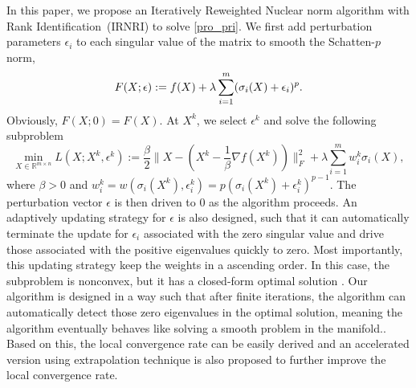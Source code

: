 \documentclass[twoside,11pt]{article}
\numberwithin{equation}{section}
\begin{document}
In this paper, we propose an Iteratively Reweighted  Nuclear norm algorithm with Rank Identification~(IRNRI) to solve \eqref{pro_pri}.
We first add perturbation  parameters $\epsilon_i$ to each singular value of the matrix to smooth the Schatten-$p$ norm, 
\begin{equation}\label{pro_reg_eps}
  F(X;\epsilon) := f(X) + \lambda \sum_{i=1}^{m} (\sigma_{i} (X) + \epsilon_i)^{p}. \\
\end{equation} 
Obviously, $F(X; 0) = F(X)$. 
At $X^k$, we select $\epsilon^k$ and solve the following subproblem
\begin{equation}\label{Scp2Cvx_IRNN}
\min_{X\in\mathbb{R}^{m\times n}}  L(X;X^{k},\epsilon^{k}):= \frac{\beta}{2} \| X-(X^{k}-\frac{1}{\beta}\nabla f(X^{k})) \|_{F}^{2}  + \lambda\sum\limits_{i=1}^{m}w_{i}^{k}  \sigma_{i}(X),
\end{equation}
where  $\beta > 0$ and  $ w_{i}^{k} = w(\sigma_{i}(X^{k}),\epsilon_{i}^{k}) = p(\sigma_i(X^{k}) +\epsilon_i^k)^{p-1} $. 
The perturbation vector $\epsilon$ is then driven to 0 as the algorithm proceeds.  
An adaptively updating strategy for $\epsilon$ is also designed, such that it can automatically terminate the update for $\epsilon_i$ associated with the zero singular value and drive those associated with the positive eigenvalues quickly to zero. 
Most importantly, this updating strategy keep the weights in a ascending order. 
In this case, the subproblem is nonconvex, but it has a closed-form optimal solution \cite{opt_simu_svd_2017}.  
Our algorithm is designed in a way such that after finite iterations, the algorithm can automatically detect those zero eigenvalues in the optimal solution, meaning the algorithm eventually behaves like solving a smooth problem in the manifold..  
Based on this,  the local convergence rate can be easily derived and 
an accelerated version using extrapolation technique is also proposed to further improve the local convergence rate.  
\end{document}
